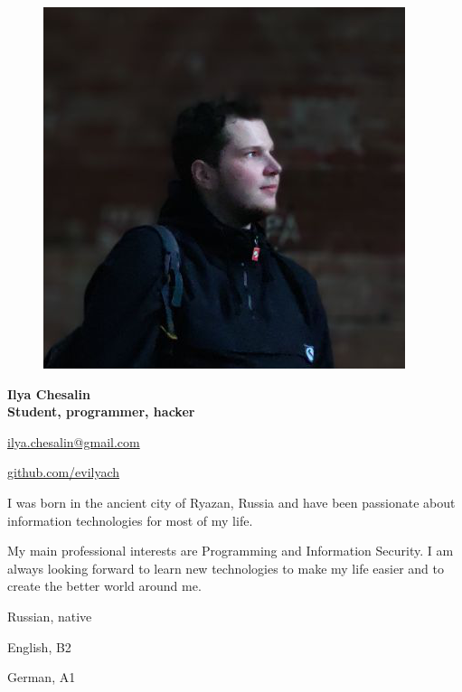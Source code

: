 \begin{figure}
	\hfill
	\includegraphics[width=0.6\columnwidth]{photo}
	\vspace{-7cm}
\end{figure}

\begin{flushright}\small

\end{flushright}\normalsize
\framebreak


\Huge\bfseries {{\color{Cyan} Ilya} {\color{Black} Chesalin}} \\
\Large\bfseries Student, programmer, hacker \\

\normalsize\normalfont


 \url{ilya.chesalin@gmail.com}

 \url{github.com/evilyach}

\SmallSep

I was born in the ancient city of Ryazan, Russia and have been passionate about
information technologies for most of my life.

My main professional interests are Programming and Information Security. I am
always looking forward to learn new technologies to make my life easier and to
create the better world around me.

\Sep


\begin{multicols}{3}
\begin{compactitem}[\color{Cyan}$\circ$]
    \item Russian, native
    \item English, B2
    \item German, A1
\end{compactitem}
\end{multicols}

